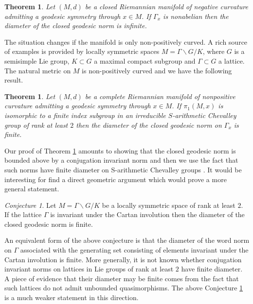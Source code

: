 \documentclass[12pt]{amsart}
\newtheorem{theorem}[subsection]{Theorem}%
\theoremstyle{definition}
\theoremstyle{remark}
\newtheorem{conjecture}[subsection]{Conjecture}
\numberwithin{figure}{section}
\numberwithin{table}{section}
\numberwithin{equation}{section}
\begin{document}
\begin{theorem}\label{T:negative}
Let $(M,d)$ be a closed Riemannian manifold of negative curvature admitting a
geodesic symmetry through $x\in M$.  If $\Gamma_x$ is nonabelian then the
diameter of the closed geodesic norm is infinite.
\end{theorem}

The situation changes if the manifold is only non-positively curved.
A rich source of examples is provided by locally symmetric spaces
$M = \Gamma \backslash G/K$, where $G$ is a semisimple Lie group,
$K\subset G$ a maximal compact subgroup and $\Gamma \subset G$ a lattice.
The natural metric on $M$ is non-positively curved and we have the
following result. 

\begin{theorem}\label{T:chevalley}
Let $(M,d)$ be a complete Riemannian manifold of nonpositive curvature
admitting a geodesic symmetry through $x\in M$.  If $\pi_1(M,x)$ is isomorphic
to a finite index subgroup in an irreducible $S$-arithmetic Chevalley group of
rank at least $2$ then the diameter of the closed geodesic norm on $\Gamma_x$
is finite.
\end{theorem}

Our proof of Theorem \ref{T:chevalley} amounts to showing that the closed
geodesic norm is bounded above by a conjugation invariant norm and then we use
the fact that such norms have finite diameter on S-arithmetic Chevalley groups
\cite{MR2819193,MR2819193-add}.  It would be interesting for find a direct
geometric argument which would prove a more general statement. 

\begin{conjecture}\label{conjecture}
Let $M=\Gamma \backslash G/K$ be a locally symmetric space of rank
at least $2$. If the lattice $\Gamma$ is invariant under the Cartan
involution then the diameter of the closed geodesic norm is finite.
\end{conjecture}

An equivalent form of the above conjecture is that the diameter of the word
norm on $\Gamma$ associated with the generating set consisting of elements
invariant under the Cartan involution is finite.  More generally, it is not
known whether conjugation invariant norms on lattices in Lie groups of rank at
least $2$ have finite diameter.  A piece of evidence that their diameter may be
finite comes from the fact that such lattices do not admit unbounded
quasimorphisms. The above Conjecture \ref{conjecture} is a much weaker
statement in this direction.
\end{document}
